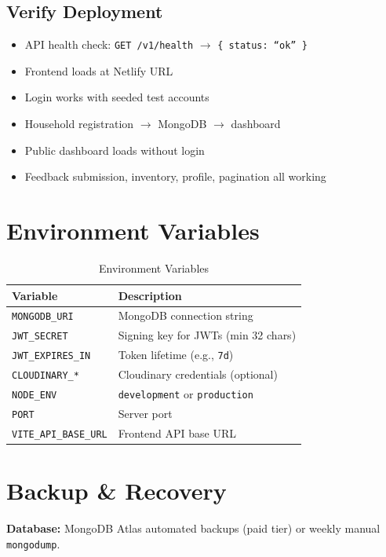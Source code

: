 \subsection{Verify Deployment}
\begin{itemize}[nosep]
    \item[x] API health check: \texttt{GET /v1/health} $\rightarrow$ \texttt{\{ status: ``ok'' \}}
    \item[x] Frontend loads at Netlify URL
    \item[x] Login works with seeded test accounts
    \item[x] Household registration $\rightarrow$ MongoDB $\rightarrow$ dashboard
    \item[x] Public dashboard loads without login
    \item[x] Feedback submission, inventory, profile, pagination all working
\end{itemize}

\section{Environment Variables}
\begin{table}[H]
\centering
\caption{Environment Variables}
\label{tab:env}
\begin{tabularx}{\textwidth}{@{}lX@{}}
\toprule
Variable & Description \\
\midrule
\texttt{MONGODB\_URI} & MongoDB connection string \\
\texttt{JWT\_SECRET} & Signing key for JWTs (min 32 chars) \\
\texttt{JWT\_EXPIRES\_IN} & Token lifetime (e.g., \texttt{7d}) \\
\texttt{CLOUDINARY\_*} & Cloudinary credentials (optional) \\
\texttt{NODE\_ENV} & \texttt{development} or \texttt{production} \\
\texttt{PORT} & Server port \\
\texttt{VITE\_API\_BASE\_URL} & Frontend API base URL \\
\bottomrule
\end{tabularx}
\end{table}

\section{Backup \& Recovery}
\textbf{Database:} MongoDB Atlas automated backups (paid tier) or weekly manual \texttt{mongodump}.

